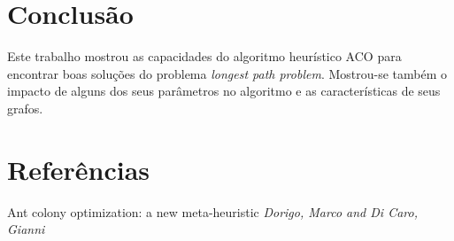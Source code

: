 \section{Conclusão}

Este trabalho mostrou as capacidades do algoritmo heurístico ACO para encontrar boas soluções
do problema \textit{longest path problem}. Mostrou-se também o impacto de alguns dos seus parâmetros
no algoritmo e as características de seus grafos.

\section{Referências}

Ant colony optimization: a new meta-heuristic \textit{Dorigo, Marco and Di Caro, Gianni}
